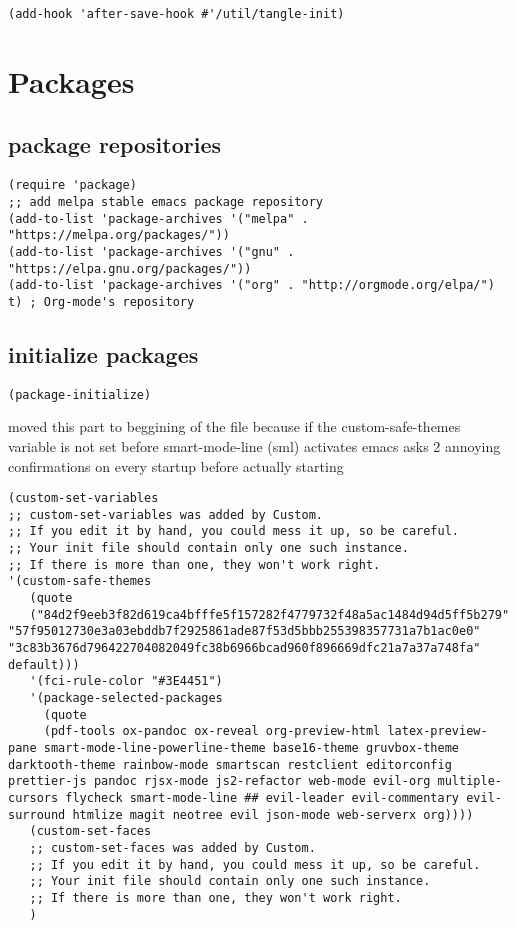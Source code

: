 \documentclass[11pt]{article}
\begin{document}
\begin{verbatim}
(add-hook 'after-save-hook #'/util/tangle-init)
\end{verbatim}

\section*{Packages}
\label{sec:org9ed8a4f}

\subsection*{package repositories}
\label{sec:org7c8cec6}

\begin{verbatim}
(require 'package)
;; add melpa stable emacs package repository
(add-to-list 'package-archives '("melpa" . "https://melpa.org/packages/"))
(add-to-list 'package-archives '("gnu" . "https://elpa.gnu.org/packages/"))
(add-to-list 'package-archives '("org" . "http://orgmode.org/elpa/") t) ; Org-mode's repository
\end{verbatim}

\subsection*{initialize packages}
\label{sec:org3fec0ec}
\begin{verbatim}
(package-initialize)
\end{verbatim}

moved this part to beggining of the file because if the
custom-safe-themes variable is not set before smart-mode-line (sml) activates
emacs asks 2 annoying confirmations on every startup before actually starting

\begin{verbatim}
(custom-set-variables
;; custom-set-variables was added by Custom.
;; If you edit it by hand, you could mess it up, so be careful.
;; Your init file should contain only one such instance.
;; If there is more than one, they won't work right.
'(custom-safe-themes
   (quote
   ("84d2f9eeb3f82d619ca4bfffe5f157282f4779732f48a5ac1484d94d5ff5b279" "57f95012730e3a03ebddb7f2925861ade87f53d5bbb255398357731a7b1ac0e0" "3c83b3676d796422704082049fc38b6966bcad960f896669dfc21a7a37a748fa" default)))
   '(fci-rule-color "#3E4451")
   '(package-selected-packages
     (quote
     (pdf-tools ox-pandoc ox-reveal org-preview-html latex-preview-pane smart-mode-line-powerline-theme base16-theme gruvbox-theme darktooth-theme rainbow-mode smartscan restclient editorconfig prettier-js pandoc rjsx-mode js2-refactor web-mode evil-org multiple-cursors flycheck smart-mode-line ## evil-leader evil-commentary evil-surround htmlize magit neotree evil json-mode web-serverx org))))
   (custom-set-faces
   ;; custom-set-faces was added by Custom.
   ;; If you edit it by hand, you could mess it up, so be careful.
   ;; Your init file should contain only one such instance.
   ;; If there is more than one, they won't work right.
   )
\end{verbatim}
\end{document}
